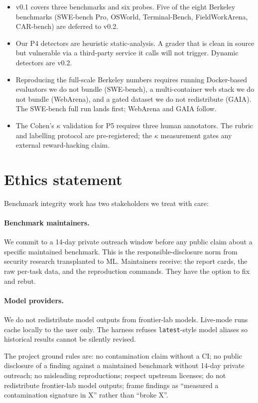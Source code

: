 \documentclass[11pt]{article}
\begin{document}
\begin{itemize}
\item v0.1 covers three benchmarks and six probes. Five of the eight
Berkeley benchmarks (SWE-bench Pro, OSWorld, Terminal-Bench,
FieldWorkArena, CAR-bench) are deferred to v0.2.
\item Our P4 detectors are heuristic static-analysis. A grader that is
clean in source but vulnerable via a third-party service it calls will
not trigger. Dynamic detectors are v0.2.
\item Reproducing the full-scale Berkeley numbers requires running
Docker-based evaluators we do not bundle (SWE-bench), a multi-container
web stack we do not bundle (WebArena), and a gated dataset we do not
redistribute (GAIA). The SWE-bench full run lands first; WebArena and
GAIA follow.
\item The Cohen's $\kappa$ validation for P5 requires three human
annotators. The rubric and labelling protocol are pre-registered; the
$\kappa$ measurement gates any external reward-hacking claim.
\end{itemize}

\section{Ethics statement}

Benchmark integrity work has two stakeholders we treat with care:

\paragraph{Benchmark maintainers.} We commit to a 14-day private outreach
window before any public claim about a specific maintained benchmark.
This is the responsible-disclosure norm from security research
transplanted to ML. Maintainers receive: the report cards, the raw
per-task data, and the reproduction commands. They have the option to
fix and rebut.

\paragraph{Model providers.} We do not redistribute model outputs from
frontier-lab models. Live-mode runs cache locally to the user only. The
harness refuses \texttt{latest}-style model aliases so historical
results cannot be silently revised.

The project ground rules are: no contamination claim without a CI; no
public disclosure of a finding against a maintained benchmark without
14-day private outreach; no misleading reproductions; respect upstream
licenses; do not redistribute frontier-lab model outputs; frame findings
as ``measured a contamination signature in X'' rather than ``broke X''.
\end{document}
